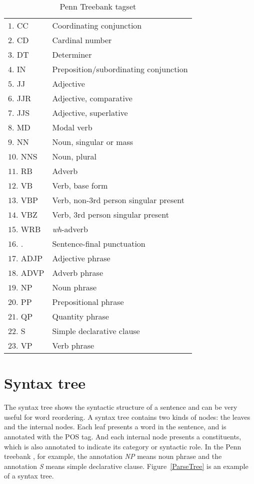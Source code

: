 \begin{table}
\centering
\begin{tabular}{|p{4.5cm}l|}
\hline
$1$. \hphantom{1}CC &  Coordinating conjunction\\
$2$.  \hphantom{1}CD &  Cardinal number\\
$3$. \hphantom{1}DT &  Determiner\\
$4$. \hphantom{1}IN &  Preposition/subordinating conjunction\\
$5$. \hphantom{1}JJ &  Adjective\\
$6$. \hphantom{1}JJR &   Adjective, comparative\\
$7$. \hphantom{1}JJS &   Adjective, superlative\\
$8$. \hphantom{1} MD &  Modal verb\\
$9$. \hphantom{1} NN &  Noun, singular or mass\\
$10$. NNS &   Noun, plural\\
$11$. RB &  Adverb\\
$12$. VB &  Verb, base form\\
$13$. VBP &   Verb, non-3rd person singular present\\
$14$. VBZ &   Verb, 3rd person singular present\\
$15$. WRB &   \emph{wh}-adverb\\
$16$. . &   Sentence-final punctuation\\
$17$. ADJP &  Adjective phrase\\
$18$. ADVP &  Adverb phrase\\
$19$. NP &  Noun phrase\\
$20$. PP &  Prepositional phrase\\
$21$. QP &  Quantity phrase\\
$22$. S &  Simple declarative clause\\
$23$. VP &  Verb phrase \\ \hline
\end{tabular}
\caption{Penn Treebank tagset}
\label{ttags}
\end{table}
\label{ch:Foundations:sec:PosTag}

\section{Syntax tree}
\label{ch:Foundations:sec:SyntacticTree}

The syntax tree shows the syntactic structure of a sentence and can be very useful for word reordering. A syntax tree contains two kinds of nodes: the leaves and the internal nodes. Each leaf presents a word in the sentence, and is annotated with the POS tag. And each internal node presents a constituents, which is also annotated to indicate its category or syntactic role. In the Penn treebank \citep{penn, penn3}, for example, the annotation \emph{NP} means noun phrase and the annotation \emph{S} means simple declarative clause. Figure~\ref{ParseTree} is an example of a syntax tree.

